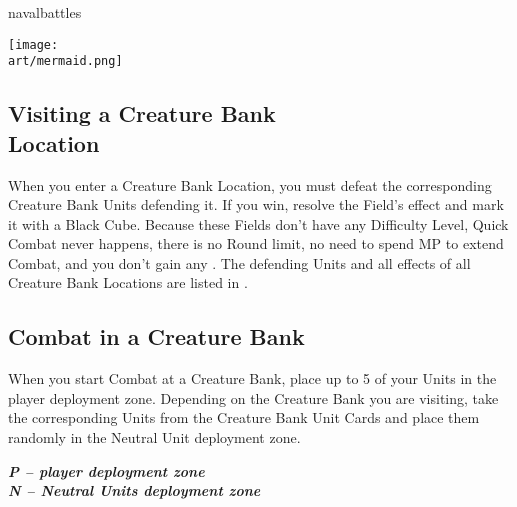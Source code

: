 \begin{expansion}[before=\vspace*{-11mm}]{navalbattles}
\begin{multicols*}{2}
  \begin{center}
    \texttt{[image: \\art/mermaid.png]}
  \end{center}
  \columnbreak

  \subsection*{Visiting a Creature Bank\\Location}
  When you enter a Creature Bank Location, you must defeat the corresponding Creature Bank Units defending it.
  If you win, resolve the Field's effect and mark it with a Black Cube.
  Because these Fields don't have any Difficulty Level, Quick Combat never happens, there is no Round limit, no need to spend MP to extend Combat, and you don't gain any .
  The defending Units and all effects of all Creature Bank Locations are listed in .

  \subsection*{Combat in a Creature Bank}
  When you start Combat at a Creature Bank, place up to 5 of your Units in the player deployment zone.
  Depending on the Creature Bank you are visiting, take the corresponding Units from the Creature Bank Unit Cards and place them randomly in the Neutral Unit deployment zone.

  \bigskip
  \begin{center}
  \end{center}
  \textbf{\footnotesize\textit{\textcolor{darkcandyapplered}{P -- player deployment zone}}}\\
  \textbf{\footnotesize\textit{\textcolor{darkcandyapplered}{N -- Neutral Units deployment zone}}}\\
  \bigskip


\end{multicols*}
\end{expansion}
